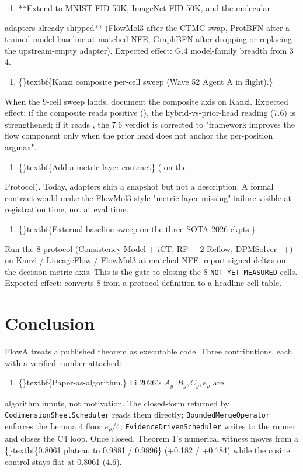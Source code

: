 \documentclass{article}
\begin{document}
\begin{enumerate}
\item **Extend to MNIST FID-50K, ImageNet FID-50K, and the molecular
\end{enumerate}
adapters already shipped** (FlowMol3 after the CTMC swap, ProtBFN after a trained-model baseline at matched NFE, GraphBFN after dropping or replacing the upstream-empty adapter). Expected effect: G.4 model-family breadth from 3   4.

\begin{enumerate}
\item \{\}textbf\{Kanzi composite per-cell sweep (Wave 52 Agent A in flight).\}
\end{enumerate}
When the 9-cell sweep lands, document the composite axis on Kanzi. Expected effect: if the composite reads positive (), the hybrid-vs-prior-head reading (7.6) is strengthened; if it reads , the 7.6 verdict is corrected to "framework improves the flow component only when the prior head does not anchor the per-position argmax".

\begin{enumerate}
\item \{\}textbf\{Add a metric-layer contract\} ( on the
\end{enumerate}
Protocol). Today, adapters ship a  snapshot but not a  description. A formal contract would make the FlowMol3-style "metric layer missing" failure visible at registration time, not at eval time.

\begin{enumerate}
\item \{\}textbf\{External-baseline sweep on the three SOTA 2026 ckpts.\}
\end{enumerate}
Run the 8 protocol (Consistency-Model + iCT, RF + 2-Reflow, DPMSolver++) on Kanzi / LineageFlow / FlowMol3 at matched NFE, report signed deltas on the decision-metric axis. This is the gate to closing the 8 \texttt{NOT YET MEASURED} cells. Expected effect: converts 8 from a protocol definition to a headline-cell table.

\section{Conclusion}
FlowA treats a published theorem as executable code. Three contributions, each with a verified number attached:

\begin{enumerate}
\item \{\}textbf\{Paper-as-algorithm.\} Li 2026's $A_g, B_g, C_g, e_\rho$ are
\end{enumerate}
algorithm inputs, not motivation. The closed-form  returned by \texttt{CodimensionSheetScheduler} reads them directly; \texttt{BoundedMergeOperator} enforces the Lemma 4 floor $e_\rho/4$; \texttt{EvidenceDrivenScheduler} writes  to the runner and closes the C4 loop. Once closed, Theorem 1's numerical witness  moves from a \{\}textbf\{0.8061 plateau to 0.9881 / 0.9896\} (+0.182 / +0.184) while the cosine control stays flat at 0.8061 (4.6).
\end{document}
